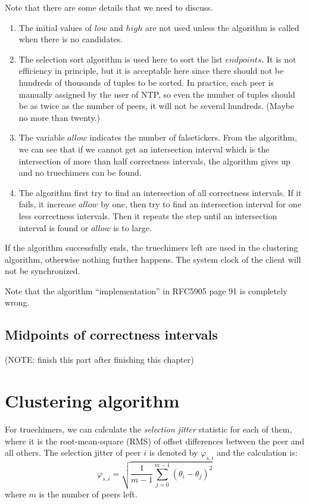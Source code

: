 Note that there are some details that we need to discuss. 
\begin{enumerate}
    \item 
        The initial values of $low$ and $high$ are not used unless the
        algorithm is called when there is no candidates.
    \item 
        The selection sort algorithm is used here to sort the list
        $endpoints$. It is not efficiency in principle, but it is acceptable
        here since there should not be hundreds of thousands of tuples to be
        sorted. In practice, each peer is manually assigned by the user of
        NTP, so even the number of tuples should be as twice as the number of
        peers, it will not be several hundreds. (Maybe no more than twenty.)
    \item
        The variable $allow$ indicates the number of falsetickers. From the
        algorithm, we can see that if we cannot get an intersection interval
        which is the intersection of more than half correctness intervals,
        the algorithm gives up and no truechimers can be
        found.~\cite{clock_selection}
    \item
        The algorithm first try to find an intersection of all correctness
        intervals. If it fails, it increase $allow$ by one, then try to find
        an intersection interval for one less correctness intervals. Then it
        repeats the step until an intersection interval is found or $allow$
        is to large.
\end{enumerate}
If the algorithm successfully ends, the truechimers left are used in the
clustering algorithm, otherwise nothing further happens.  The system clock of
the client will not be synchronized.

Note that the algorithm ``implementation'' in RFC5905 page 91 is completely
wrong.

\subsection{Midpoints of correctness intervals}
\label{midpoints_of_correctness_intervals}
(NOTE: finish this part after finishing this chapter)

\section{Clustering algorithm}%
\label{sec:clustering_algorithm}
For truechimers, we can  calculate the \emph{selection jitter} statistic for
each of them, where it is the root-mean-square (RMS) of offset differences
between the peer and all others. The selection jitter of peer $i$ is denoted by
$\varphi_{s,i}$ and the calculation is:
\begin{equation}
    \varphi_{s,i} = \sqrt{\frac{1}{m-1} \sum^{m-1}_{j=0} (\theta_i -
    \theta_j)^2 }
    \label{eq:selection_jitter}
\end{equation}
where $m$ is the number of peers left.

